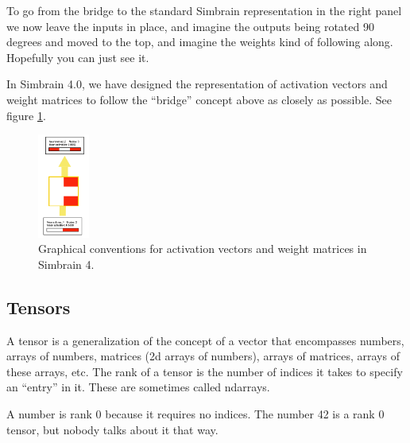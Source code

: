 To go from the bridge to the standard Simbrain representation in the right panel we now leave the inputs in place, and imagine the outputs being rotated 90 degrees and moved to the top, and imagine the weights kind of following along. Hopefully you can just see it. 

In Simbrain 4.0, we have designed the representation of activation vectors and weight matrices to follow the ``bridge'' concept above as closely as possible.  See figure \ref{simbrain4_ff23}.

\begin{figure}[h]
\centering
\includegraphics[width=0.15\textwidth]{images/simbrain4_ff_2_3.png}
\caption[Jeff Yoshimi.]{Graphical conventions for activation vectors and weight matrices in Simbrain 4. }
\label{simbrain4_ff23}
\end{figure}
%
%
%



\subsection{Tensors}

A tensor is a generalization of the concept of a vector that encompasses numbers, arrays of numbers, matrices (2d arrays of numbers), arrays of matrices, arrays of these arrays, etc. The rank of a  tensor is the number of indices it takes to specify an ``entry'' in it. These are sometimes called ndarrays.  

A number is rank 0 because it requires no indices.  The number 42 is a rank 0 tensor, but nobody talks about it that way. 

